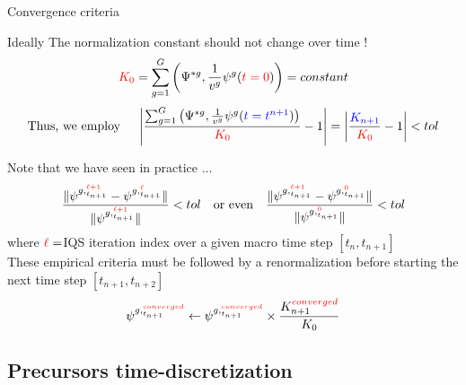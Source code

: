 \documentclass[8pt]{beamer}
\newcommand{\tcr}[1]{\textcolor{red}{#1}}
\newcommand{\tcb}[1]{\textcolor{blue}{#1}}
\begin{document}
\begin{frame}{Convergence criteria}


\begin{block}{Ideally}
The normalization constant should not change over time !
\[
\tcr{K_0} = \sum_{g=1}^G\left(\Psi^{*g},\frac{1}{v^g}\psi^g(\tcr{t=0})\right)= constant
\]
\[
\text{Thus, we employ }\quad
\left| \frac{\sum_{g=1}^G\left(\Psi^{*g},\frac{1}{v^g}\psi^g(\tcb{t=t^{n+1}})\right)}{\tcr{K_0}}-1\right| 
= \left| \frac{\tcb{K_{n+1}}}{{\tcr{K_0}}}-1\right|  < tol
\]
\end{block}

\begin{block}{Note that we have seen in practice ... }
\[
\frac{ \| \psi^{g,_{t_{n+1}}^{\tcr{\ell+1}}} - \psi^{g,_{t_{n+1}}^{\tcr{\ell}}} \|}{\| \psi^{g,_{t_{n+1}}^{\tcr{\ell+1}}} \|} < tol 
\quad \text{or even} \quad
\frac{ \| \psi^{g,_{t_{n+1}}^{\tcr{\ell+1}}} - \psi^{g,_{t_{n+1}}^{\tcr{0}}} \|}{\| \psi^{g,_{t_{n+1}}^{\tcr{0}}} \|} < tol 
\]
where $\tcr{\ell}=$IQS iteration index over a given macro time step $[t_n,t_{n+1}]$\\
\smallskip
These empirical criteria must be followed by a renormalization before starting the next time step $[t_{n+1},t_{n+2}]$
\[
\psi^{g,_{t_{n+1}}^{\tcr{converged}}} \leftarrow \psi^{g,_{t_{n+1}}^{\tcr{converged}}} \times \frac{K_{n+1}^{\tcr{converged}}}{K_0}
\]
\end{block}


\end{frame}

\subsection{Precursors time-discretization}
\end{document}
